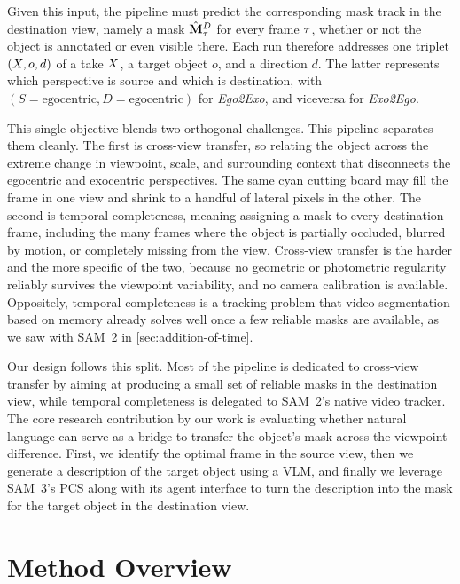 Given this input, the pipeline must predict the corresponding mask track in the destination view, namely a mask $\hat{\mathbf{M}}^D_\tau$ for every frame $\tau$, whether or not the object is annotated or even visible there. Each run therefore addresses one triplet $(X, o, d)$ of a take $X$, a target object $o$, and a direction $d$. The latter represents which perspective is source and which is destination, with $(S=\text{egocentric}, D=\text{egocentric})$ for \textit{Ego2Exo}, and viceversa for \textit{Exo2Ego}.

\newpage
This single objective blends two orthogonal challenges. This pipeline separates them cleanly. The first is cross-view transfer, so relating the object across the extreme change in viewpoint, scale, and surrounding context that disconnects the egocentric and exocentric perspectives. The same cyan cutting board may fill the frame in one view and shrink to a handful of lateral pixels in the other. The second is temporal completeness, meaning assigning a mask to every destination frame, including the many frames where the object is partially occluded, blurred by motion, or completely missing from the view. Cross-view transfer is the harder and the more specific of the two, because no geometric or photometric regularity reliably survives the viewpoint variability, and no camera calibration is available. Oppositely, temporal completeness is a tracking problem that video segmentation based on memory already solves well once a few reliable masks are available, as we saw with SAM~2 in \cref{sec:addition-of-time}.

Our design follows this split. Most of the pipeline is dedicated to cross-view transfer by aiming at producing a small set of reliable masks in the destination view, while temporal completeness is delegated to SAM~2's native video tracker. The core research contribution by our work is evaluating whether natural language can serve as a bridge to transfer the object's mask across the viewpoint difference. First, we identify the optimal frame in the source view, then we generate a description of the target object using a VLM, and finally we leverage SAM~3's PCS along with its agent interface to turn the description into the mask for the target object in the destination view.

\section{Method Overview}
\label{sec:method-overview}

